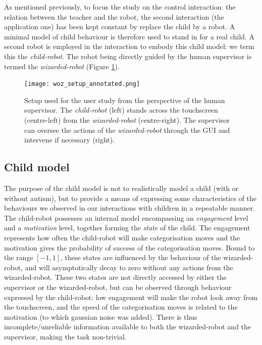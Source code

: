 As mentioned previously, to focus the study on the control interaction: the relation between the teacher and the robot, the second interaction (the application one) has been kept constant by replace the child by a robot. A minimal model of child behaviour is therefore used to stand in for a real child. A second robot is employed in the interaction to embody this child model: we term this the \textit{child-robot}. The robot being directly guided by the human supervisor is termed the \textit{wizarded-robot} (Figure \ref{fig:woz_setup}).

\begin{figure}[t!]
	\centering
	\texttt{[image: woz\_setup\_annotated.png]}
	\caption{Setup used for the user study from the perspective of the human supervisor. The \textit{child-robot} (left) stands across the touchscreen (centre-left) from the \textit{wizarded-robot} (centre-right). The supervisor can oversee the actions of the \textit{wizarded-robot} through the GUI and intervene if necessary (right).}
	\label{fig:woz_setup}
\end{figure}
		
\subsection{Child model} \label{ssec:woz_child}

The purpose of the child model is not to realistically model a child (with or without autism), but to provide a means of expressing some characteristics of the behaviours we observed in our interactions with children in a repeatable manner. The child-robot possesses an internal model encompassing an \emph{engagement} level and a \emph{motivation} level, together forming the \textit{state} of the child. The engagement represents how often the child-robot will make categorisation moves and the motivation gives the probability of success of the categorisation moves. Bound to the range $[-1, 1]$, these states are influenced by the behaviour of the wizarded-robot, and will asymptotically decay to zero without any actions from the wizarded-robot. These two states are not directly accessed by either the supervisor or the wizarded-robot, but can be observed through behaviour expressed by the child-robot: low engagement will make the robot look away from the touchscreen, and the speed of the categorisation moves is related to the motivation (to which gaussian noise was added). There is thus incomplete/unreliable information available to both the wizarded-robot and the supervisor, making the task non-trivial.

